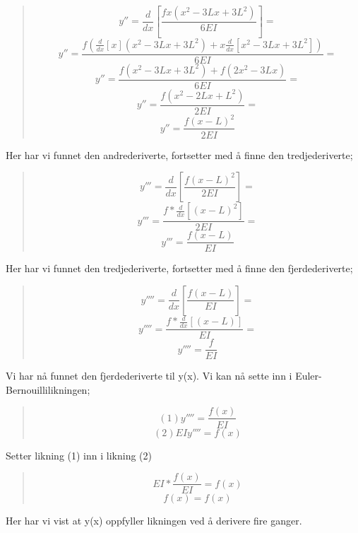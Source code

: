 \begin{quote}
\begin{equation*}
y''=\frac{d}{dx}[\frac{fx(x^2-3Lx+3L^2)}{6EI}]=
\end{equation*}
\begin{equation*}
y''=\frac{f( \frac{d}{dx}[x](x^2-3Lx+3L^2) + x\frac{d}{dx}[x^2-3Lx+3L^2] )}{6EI}=
\end{equation*}
\begin{equation*}
y''=\frac{f(x^2-3Lx+3L^2) + f(2x^2-3Lx)}{6EI}=
\end{equation*}
\begin{equation*}
y''=\frac{f(x^2-2Lx+L^2)}{2EI}=
\end{equation*}
\begin{equation*}
y''=\frac{f(x-L)^2}{2EI}
\end{equation*}
\end{quote}
Her har vi funnet den andrederiverte, fortsetter med å finne den tredjederiverte;
\begin{quote}
\begin{equation*}
y'''=\frac{d}{dx}[\frac{f(x-L)^2}{2EI}]=
\end{equation*}
\begin{equation*}
y'''=\frac{f*\frac{d}{dx}[(x-L)^2]}{2EI}=
\end{equation*}
\begin{equation*}
y'''=\frac{f(x-L)}{EI}
\end{equation*}
\end{quote}
Her har vi funnet den tredjederiverte, fortsetter med å finne den fjerdederiverte;
\begin{quote}
\begin{equation*}
y''''=\frac{d}{dx}[\frac{f(x-L)}{EI}]=
\end{equation*}
\begin{equation*}
y''''=\frac{f*\frac{d}{dx}[(x-L)]}{EI}=
\end{equation*}
\begin{equation*}
y''''=\frac{f}{EI}
\end{equation*}
\end{quote}
Vi har nå funnet den fjerdederiverte til y(x). Vi kan nå sette inn i Euler-Bernouillilikningen;
\begin{quote}
\begin{equation*}
(1) y'''' = \frac{f(x)}{EI}
\end{equation*}
\begin{equation*}
(2) EIy'''' = f(x)
\end{equation*}
\end{quote}
Setter likning (1) inn i likning (2)
\begin{quote}
\begin{equation*}
EI*\frac{f(x)}{EI} = f(x)
\end{equation*}
\begin{equation*}
f(x) = f(x)
\end{equation*}
\end{quote}
Her har vi vist at y(x) oppfyller likningen ved å derivere fire ganger.

